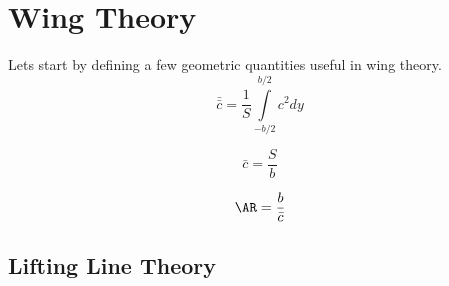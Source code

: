 




\newpage
\chapter{Wing Theory}
Lets start by defining a few geometric quantities useful in wing theory.
\begin{equation}
    \label{cord_am}
    \bar{\bar{c}} = \frac{1}{S} \int\limits_{-b/2}^{b/2} c^2 dy
\end{equation}

\begin{equation}
    \label{cord_sm}
    \bar{c} = \frac{S}{b} 
\end{equation}


\begin{equation}
    \label{aspect_ration}
    \AR = \frac{b}{\bar{c}} 
\end{equation}

\section{Lifting Line Theory}





